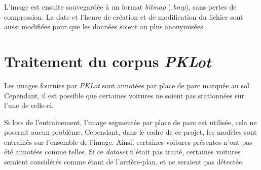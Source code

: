 L'image est ensuite sauvegardée à un format \textit{bitmap} (\textit{.bmp}), sans pertes de compression. La date et l'heure de création et de modification du fichier sont aussi modifiées pour que les données soient au plus anonymisées.

\section{Traitement du corpus \textit{PKLot}} \label{realisation.dataset}

Les images fournies par \textit{PKLot} sont annotées par place de parc marquée au sol. Cependant, il est possible que certaines voitures ne soient pas stationnées sur l'une de celle-ci. 

Si lors de l'entrainement, l'image segmentée par place de parc est utilisée, cela ne poserait aucun problème. Cependant, dans le cadre de ce projet, les modèles sont entrainés sur l'ensemble de l'image. Ainsi, certaines voitures présentes n'ont pas été annotées comme telles. Si ce \textit{dataset} n'était pas traité, certaines voitures seraient considérés comme étant de l'arrière-plan, et ne seraient pas détectée. 

